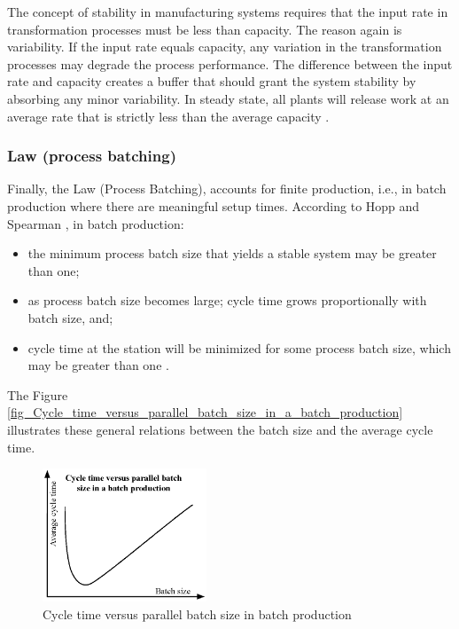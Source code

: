 \documentclass{article}
\begin{document}
The concept of stability in manufacturing systems requires that the input rate in transformation processes must be less than capacity.
The reason again is variability.
If the input rate equals capacity, any variation in the transformation processes may degrade the process performance.
The difference between the input rate and capacity creates a buffer that should grant the system stability by absorbing any minor variability.
In steady state, all plants will release work at an average rate that is strictly less than the average capacity \citep{Hopp2001}.

\subsubsection{Law (process batching)}
\label{sec:org926869d}

Finally, the Law (Process Batching), accounts for finite production, i.e., in batch production where there are meaningful setup times.
According to Hopp and Spearman \cite{Hopp2001}, in batch production:

\begin{itemize}
    \item the minimum process batch size that yields a stable system may be greater than one;
    \item as process batch size becomes large; cycle time grows proportionally with batch size, and;
    \item cycle time at the station will be minimized for some process batch size, which may be greater than one \citep[p.306]{Hopp2001}.
\end{itemize}

The Figure \ref{fig_Cycle_time_versus_parallel_batch_size_in_a_batch_production} illustrates these general relations between the batch size and the average cycle time.

\begin{figure}[htbp]
\centering
\includegraphics[height=150]{Figures/Cycle_time_versus_parallel_batch_size_in_a_batch_production.eps}
\caption{\label{fig:orgf80a82c}Cycle time versus parallel batch size in batch production}
\end{figure}
\end{document}
